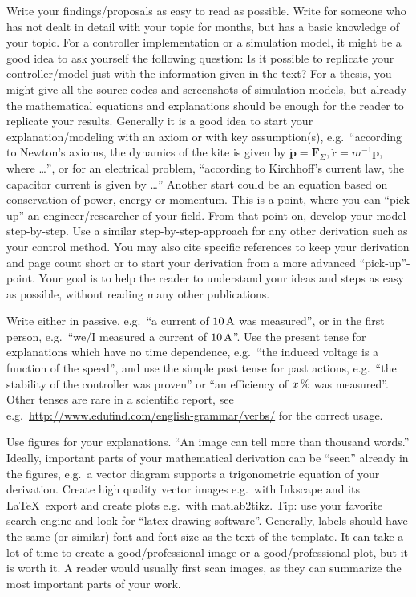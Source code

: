 \documentclass[journal]{IEEEtran}
\newcounter{assumption}
\renewcommand{\v}{\boldsymbol} %
\begin{document}
Write your findings/proposals as easy to read as possible. Write for someone who has not dealt in detail with your topic for months, but has a basic knowledge of your topic. For a controller implementation or a simulation model, it might be a good idea to ask yourself the following question: Is it possible to replicate your controller/model just with the information given in the text? For a thesis, you might give all the source codes and screenshots of simulation models, but already the mathematical equations and explanations should be enough for the reader to replicate your results. Generally it is a good idea to start your explanation/modeling with an axiom or with key assumption(s), e.g.\ “according to Newton's axioms, the dynamics of the kite is given by $\v{\dot{p}} = \v{F}_\Sigma, \v{\dot{r}} = m^{-1} \v{p}$, where \dots”, or for an electrical problem, “according to Kirchhoff's current law, the capacitor current is given by \dots” Another start could be an equation based on conservation of power, energy or momentum. This is a point, where you can “pick up” an engineer/researcher of your field. From that point on, develop your model step-by-step. Use a similar step-by-step-approach for any other derivation such as your control method. You may also cite specific references to keep your derivation and page count short or to start your derivation from a more advanced “pick-up”-point. Your goal is to help the reader to understand your ideas and steps as easy as possible, without reading many other publications.

Write either in passive, e.g.\ “a current of $\unit[10]{A}$ was measured”, or in the first person, e.g.\ “we/I measured a current of $\unit[10]{A}$”. Use the present tense for explanations which have no time dependence, e.g.\ “the induced voltage is a function of the speed”, and use the simple past tense for past actions, e.g.\ “the stability of the controller was proven” or “an efficiency of $\unit[x]{\%}$ was measured”. Other tenses are rare in a scientific report, see e.g.\ \url{http://www.edufind.com/english-grammar/verbs/} for the correct usage.

Use figures for your explanations. “An image can tell more than thousand words.” Ideally, important parts of your mathematical derivation can be “seen” already in the figures, e.g.\ a vector diagram supports a trigonometric equation of your derivation. Create high quality vector images e.g.\ with Inkscape and its \LaTeX\ export and create plots e.g.\ with matlab2tikz. Tip: use your favorite search engine and look for “latex drawing software”. Generally, labels should have the same (or similar) font and font size as the text of the template. It can take a lot of time to create a good/professional image or a good/professional plot, but it is worth it. A reader would usually first scan images, as they can summarize the most important parts of your work.
\end{document}
